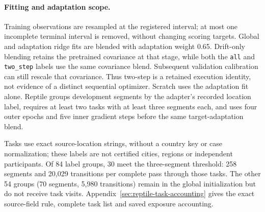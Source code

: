 \documentclass[11pt]{article}
\begin{document}
\FloatBarrier
\paragraph{Fitting and adaptation scope.}
Training observations are resampled at the registered interval; at most one
incomplete terminal interval is removed, without changing scoring targets.
Global and adaptation ridge fits are blended with adaptation weight 0.65.
Drift-only blending retains the pretrained covariance at that stage, while
both the \texttt{all} and \texttt{two\_step} labels use the same covariance
blend. Subsequent validation calibration can still rescale that covariance.
Thus two-step is a retained execution identity, not evidence of a distinct
sequential optimizer. Scratch uses the adaptation fit alone. Reptile groups
development segments by the adapter's recorded location label, requires at least two tasks with
at least three segments each, and uses four outer epochs and five inner
gradient steps before the same target-adaptation blend.

Tasks use exact source-location strings, without a country key or case
normalization; these labels are not certified cities, regions or independent
participants. Of 84 label groups, 30 meet the three-segment threshold:
258 segments and 20,029 transitions per complete pass through those tasks.
The other 54 groups (70 segments, 5,980 transitions) remain in the global
initialization but do not receive task visits. Appendix~\ref{sec:reptile-task-accounting}
gives the exact source-field rule, complete task list and saved exposure accounting.
\end{document}
